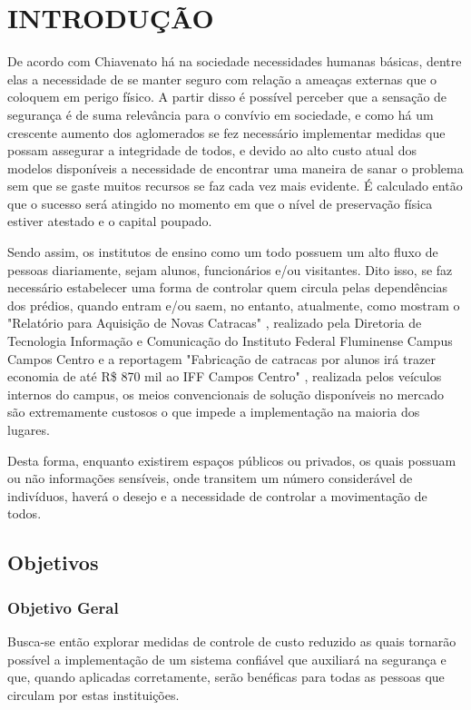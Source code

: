 \chapter{INTRODUÇÃO}
\label{cap:introducao}

De acordo com Chiavenato \cite{chiavenato2003introducao} há na sociedade necessidades humanas básicas,
dentre elas a necessidade de se manter seguro com relação a ameaças externas
que o coloquem em perigo físico. A partir disso é possível perceber que a sensação
de segurança é de suma relevância para o convívio em sociedade, e como há um crescente
aumento dos aglomerados se fez necessário implementar medidas que possam assegurar a
integridade de todos, e devido ao alto custo atual dos modelos disponíveis a necessidade
de encontrar uma maneira de sanar o problema sem que se gaste muitos recursos se faz
cada vez mais evidente. É calculado então que o sucesso será atingido no momento em que
o nível de preservação física estiver atestado e o capital poupado.



Sendo assim, os institutos de ensino como um todo possuem um alto fluxo de pessoas
diariamente, sejam alunos, funcionários e/ou visitantes. Dito isso, se faz necessário
estabelecer uma forma de controlar quem circula pelas dependências dos prédios, quando
entram e/ou saem, no entanto, atualmente, como mostram o "Relatório para Aquisição de Novas Catracas" \cite{relatorio},  realizado pela Diretoria de
Tecnologia Informação e Comunicação do Instituto Federal Fluminense Campus Campos Centro e a reportagem "Fabricação de catracas por alunos irá trazer economia de até R\$ 870 mil ao IFF Campos Centro" \cite{reportagem}, realizada pelos veículos internos do campus,  os meios convencionais de solução disponíveis
no mercado são extremamente custosos o que impede a implementação na maioria dos lugares.



Desta forma, enquanto existirem espaços públicos ou privados, os quais possuam ou não
informações sensíveis, onde transitem um número considerável de indivíduos, haverá o
desejo e a necessidade de controlar a movimentação de todos.

\section{Objetivos}
\subsection{Objetivo Geral}
Busca-se então explorar medidas de controle de custo reduzido as quais tornarão
possível a implementação de um sistema confiável que auxiliará na segurança e que,
quando aplicadas corretamente, serão benéficas para todas as pessoas que circulam
por estas instituições. 
